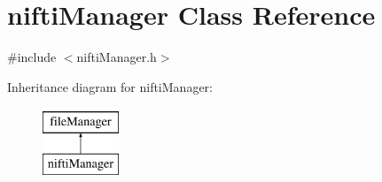 \hypertarget{classniftiManager}{\section{nifti\-Manager \-Class \-Reference}
\label{classniftiManager}
}


{\ttfamily \#include $<$nifti\-Manager.\-h$>$}

\-Inheritance diagram for nifti\-Manager\-:\begin{figure}[H]
\begin{center}
\leavevmode
\includegraphics[height=2.000000cm]{classniftiManager}
\end{center}
\end{figure}
